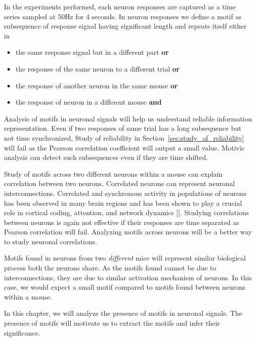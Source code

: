 \documentclass[MTech]{iitmdiss}
\begin{document}
In the experiments performed, each neuron responses are captured as a time series sampled at 50Hz for 4 seconds. In neuron responses we define a motif as subsequence of response signal having significant length and repeats itself either in
\begin{itemize}
   \item the same response signal but in a different part \textbf{or}
   \item the response of the same neuron to a different trial \textbf{or}
   \item the response of another neuron in the same mouse \textbf{or}
   \item the response of neuron in a different mouse \textbf{and}
\end{itemize}
Analysis of motifs in neuronal signals will help us understand reliable information representation. Even if two responses of same trial has a long subsequence but not time synchronized, Study of reliability in Section~\ref{sec:study_of_reliability} will fail as the Pearson correlation coefficient will output a small value. Motivic analysis can detect such subsequences even if they are time shifted.

Study of motifs across two different neurons within a mouse can explain correlation between two neurons. Correlated neurons can represent neuronal interconnections. Correlated and synchronous activity in populations of neurons has been observed in many brain regions and has been shown to play a crucial role in cortical coding, attention, and network dynamics [\cite{rosenbaum2014correlated}]. Studying correlations between neurons is again not effective if their responses are time separated as Pearson correlation will fail. Analyzing motifs across neurons will be a better way to study neuronal correlations.

Motifs found in neurons from two \textit{different} mice will represent similar biological process both the neurons share. As the motifs found cannot be due to interconnections, they are due to similar activation mechanism of neurons. In this case, we would expect a small motif compared to motifs found between neurons within a mouse.

In this chapter, we will analyze the presence of motifs in neuronal signals. The presence of motifs will motivate us to extract the motifs and infer their significance.
\end{document}
